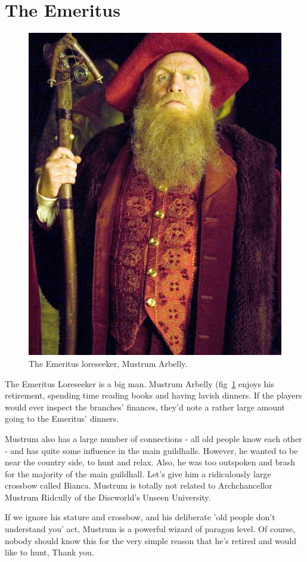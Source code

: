 \section{The Emeritus}
\begin{figure}[t]
    \centering
    \includegraphics[width=.95\textwidth]{fig/emeritus}
    \caption{\label{fig:mustrum} The Emeritus loreseeker, Mustrum Arbelly.}
\end{figure}

The Emeritus Loreseeker is a big man. Mustrum Arbelly (fig~\ref{fig:mustrum} enjoys his retirement, spending time reading books and having lavish dinners. If the players would ever inspect the branches' finances, they'd note a rather large amount going to the Emeritus' dinners.

Mustrum also has a large number of connections - all old people know each other - and has quite some influence in the main guildhalls. However, he wanted to be near the country side, to hunt and relax. Also, he was too outspoken and brash for the majority of the main guildhall. Let's give him a ridiculously large crossbow called Bianca. Mustrum is totally not related to Archchancellor Mustrum Ridcully of the Discworld's Unseen University.

If we ignore his stature and crossbow, and his deliberate 'old people don't understand you' act, Mustrum is a powerful wizard of paragon level. Of course, nobody should know this for the very simple reason that he's retired and would like to hunt, Thank you.
